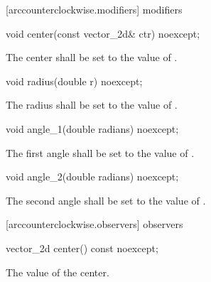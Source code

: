  [arccounterclockwise.modifiers]{ modifiers}

\begin{itemdecl}
    void center(const vector_2d& ctr) noexcept;
\end{itemdecl}
\begin{itemdescr}
	\pnum
	\effects
	The center shall be set to the value of .
\end{itemdescr}

\begin{itemdecl}
    void radius(double r) noexcept;
\end{itemdecl}
\begin{itemdescr}
	\pnum
	\effects
	The radius shall be set to the value of .
\end{itemdescr}

\begin{itemdecl}
    void angle_1(double radians) noexcept;
\end{itemdecl}
\begin{itemdescr}
	\pnum
	\effects
	The first angle shall be set to the value of .
\end{itemdescr}

\begin{itemdecl}
    void angle_2(double radians) noexcept;
\end{itemdecl}
\begin{itemdescr}
	\pnum
	\effects
	The second angle shall be set to the value of .
\end{itemdescr}

 [arccounterclockwise.observers]{ observers}

\begin{itemdecl}
    vector_2d center() const noexcept;
\end{itemdecl}
\begin{itemdescr}
	\pnum
	\returns
	The value of the center.
\end{itemdescr}

